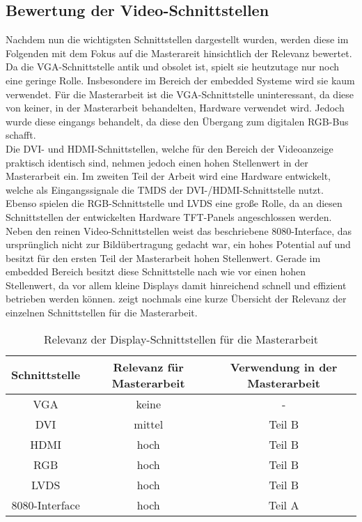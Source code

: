 \subsection{Bewertung der Video-Schnittstellen}
\label{cha:bewertung_video}
Nachdem nun die wichtigsten Schnittstellen dargestellt wurden, werden diese im Folgenden mit dem Fokus auf die Masterareit hinsichtlich der Relevanz bewertet.
Da die VGA-Schnittstelle antik und obsolet ist, spielt sie heutzutage nur noch eine geringe Rolle. Insbesondere im Bereich der embedded Systeme wird sie kaum verwendet. Für die Masterarbeit ist die VGA-Schnittstelle uninteressant, da diese von keiner, in der Masterarbeit behandelten, Hardware verwendet wird. Jedoch wurde diese eingangs behandelt, da diese den Übergang zum digitalen RGB-Bus schafft.\\
Die DVI- und HDMI-Schnittstellen, welche für den Bereich der Videoanzeige praktisch identisch sind, nehmen jedoch einen hohen Stellenwert in der Masterarbeit ein. Im zweiten Teil der Arbeit wird eine Hardware entwickelt, welche als Eingangssignale die TMDS der DVI-/HDMI-Schnittstelle nutzt. 
Ebenso spielen die RGB-Schnittstelle und LVDS eine große Rolle, da an diesen Schnittstellen der entwickelten Hardware TFT-Panels angeschlossen werden. \\
Neben den reinen Video-Schnittstellen weist das beschriebene 8080-Interface, das ursprünglich nicht zur Bildübertragung gedacht war, ein hohes Potential auf und besitzt für den ersten Teil der Masterarbeit hohen Stellenwert. Gerade im embedded Bereich besitzt diese Schnittstelle nach wie vor einen hohen Stellenwert, da vor allem kleine Displays damit hinreichend schnell und effizient betrieben werden können.  zeigt nochmals eine kurze Übersicht der Relevanz der einzelnen Schnittstellen für die Masterarbeit.

\begin{table}[h]
\begin{tabular}{|c|c|c|}\hline
   \textbf{Schnittstelle} 	& \textbf{Relevanz für Masterarbeit} 	& \textbf{Verwendung in der Masterarbeit}	\\ \hline
   VGA 						& keine  								& - 	 									\\ \hline
   DVI 						& mittel 								& Teil B 									\\ \hline
   HDMI						& hoch 									& Teil B 									\\ \hline
   RGB 						& hoch 									& Teil B 									\\ \hline
   LVDS 					& hoch									& Teil B 									\\ \hline
   8080-Interface 			& hoch 									& Teil A 									\\ \hline
\end{tabular}
\caption{Relevanz der Display-Schnittstellen für die Masterarbeit}
\label{tab:interface_vergleich}
\end{table}

